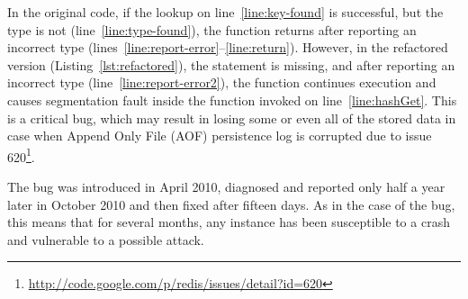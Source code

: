 In the original code, if the lookup on line~\ref{line:key-found} is successful,
but the type is not  (line~\ref{line:type-found}), the
function returns after reporting an incorrect type
(lines~\ref{line:report-error}--\ref{line:return}). However, in the refactored
version (Listing~\ref{lst:refactored}), the  statement is
missing, and after reporting an incorrect type (line~\ref{line:report-error2}),
the function continues execution and causes segmentation fault inside the
 function invoked on line~\ref{line:hashGet}. This is a
critical bug, which may result in losing some or even all of the stored data
in case when Append Only File (AOF) persistence log is corrupted due to issue
620\footnote{\url{http://code.google.com/p/redis/issues/detail?id=620}}.

The bug was introduced in April 2010, diagnosed and reported only half a year
later in October 2010 and then fixed after fifteen days.  As in the case of the
\lighttpd bug, this means that for several months, any \redis instance has been
susceptible to a crash and vulnerable to a possible attack.
